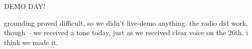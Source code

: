 DEMO DAY!

\rf grounding proved difficult, so we didn't live-demo anything. the radio did
work, though -- we received a tone today, just as we received clear voice on
the 26th. i think we made it.
